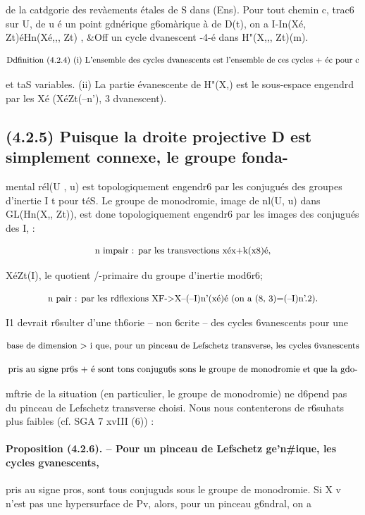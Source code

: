 \documentclass[11pt]{article}
\theoremstyle{remark}
\begin{document}
de la catdgorie des revàements étales de S dans (Ens). Pour tout chemin c, trac6 sur U, de u é un point gdnérique g6omàrique à de D(t), on a I-In(Xé, Zt)éHn(Xé,,, Zt) , \&Off un cycle dvanescent -4-é dans H"(X,,, Zt)(m).

\[\text{\small Ddfinition (4.2.4) (i) L'ensemble des cycles dvanescents est l'ensemble de ces cycles + éc pour c}\]

et taS variables. (ii) La partie évanescente de H"(X,) est le sous-espace engendrd par les Xé (XéZt(--n'), 3 dvanescent).

\subsection*{(4.2.5) Puisque la droite projective D est simplement connexe, le groupe fonda-}

mental rél(U , u) est topologiquement engendr6 par les conjugués des groupes d'inertie I t pour téS. Le groupe de monodromie, image de nl(U, u) dans GL(Hn(X,, Zt)), est done topologiquement engendr6 par les images des conjugués des I, :

\[\text{\small n impair : par les transvections xéx+k(x8)é,}\]

XéZt(I), le quotient /-primaire du groupe d'inertie mod6r6;

\[\text{\small n pair : par les rdflexions XF->X--(--I)n'(xé)é (on a (8, 3)=(--I)n'.2).}\]

I1 devrait r6sulter d'une th6orie -- non 6crite -- des cycles 6vanescents pour une

\[\text{\small base de dimension > i que, pour un pinceau de Lefschetz transverse, les cycles 6vanescents}\]

\[\text{\small pris au signe pr6s + é sont tons conjugu6s sons le groupe de monodromie et que la gdo-}\]

mftrie de la situation (en particulier, le groupe de monodromie) ne d6pend pas du pinceau de Lefschetz transverse choisi. Nous nous contenterons de r6suhats plus faibles (cf. SGA 7 xvIII (6)) :

\paragraph{Proposition (4.2.6). -- Pour un pinceau de Lefschetz ge'n\#ique, les cycles gvanescents,}

pris au signe pros, sont tous conjuguds sous le groupe de monodromie. Si X v n'est pas une hypersurface de Pv, alors, pour un pinceau g6ndral, on a
\end{document}
